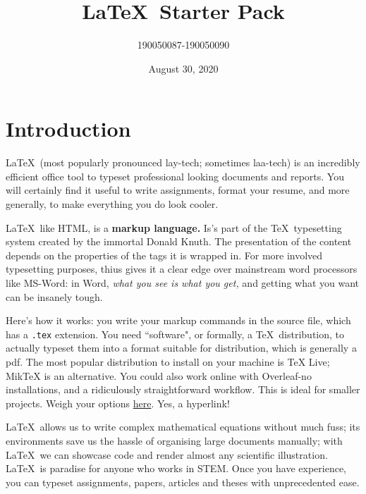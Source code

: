 \documentclass[10pt, Computer Modern]{article}
\theoremstyle{remark}
\begin{document}
\title{\LaTeX\ Starter Pack}
\author{190050087-190050090}
\date{August 30, 2020 }
\maketitle
\tableofcontents
\thispagestyle{empty}
\clearpage
{}

\section{Introduction}
\label{intro}
\LaTeX\ (most popularly pronounced lay-tech; sometimes laa-tech) is an incredibly efficient office tool to typeset professional looking documents and reports. You will certainly find it useful to write assignments, format your resume, and more generally, to make everything you do look cooler.




\LaTeX\, like HTML, is a \textbf{markup language.} Is's part of the \TeX\ typesetting system created by the immortal Donald Knuth. The presentation of the content depends on the properties of the tags it is wrapped in. For more involved typesetting purposes, thius gives it a clear edge over mainstream word processors like \textcolor{blue!40!black}{MS-Word}: in Word, \textit{what you see is what you get,} and getting what you want can be insanely tough.




Here's how it works: you write your markup commands in the source file, which has a \verb!.tex! extension. You need ``software", or formally, a \TeX\ distribution, to actually typeset them into a format suitable for distribution, which is generally a pdf. The most popular distribution to install on your machine is TeX Live; MikTeX is an alternative. You could also work online with Overleaf-no installations, and a ridiculously straightforward workflow. This is ideal for smaller projects. Weigh your options \href{https://www.latex-project.org/get/}{here}. Yes, a hyperlink!


\LaTeX\ allows us to write complex mathematical equations without much fuss; its environments
save us the hassle of organising large documents manually; with \LaTeX\ we can showcase code and
render almost any scientific illustration. \LaTeX\ is paradise for anyone who works in STEM. Once
you have experience, you can typeset assignments, papers, articles and theses with unprecedented
ease.
\end{document}
